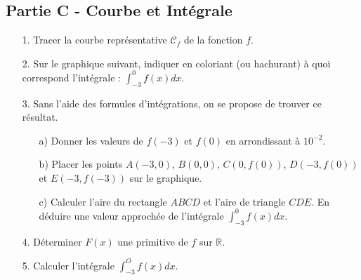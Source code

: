 \documentclass[12pt]{article}
\begin{document}
\subsection*{Partie C - Courbe et Intégrale}

\begin{enumerate}
\item[1.] Tracer la courbe représentative $\mathcal{C}_f$ de la fonction $f$.
\item[2.] Sur le graphique suivant, indiquer en coloriant (ou hachurant) à quoi correspond l'intégrale :  $\int_{-3}^{0} f(x) dx$.
\item[3.] Sans l'aide des formules d'intégrations, on se propose de trouver ce résultat.
  \begin{enumerate}
  \item[a)] Donner les valeurs de $f(-3)$ et $f(0)$ en arrondissant à $10^{-2}$.
  \item[b)] Placer les points $A\left(-3, 0\right)$, $B\left(0, 0\right)$, $C\left(0, f(0)\right)$, $D\left(-3, f(0)\right)$ et $E\left(-3, f(-3)\right)$ sur le graphique.
  \item[c)] Calculer l'aire du rectangle $ABCD$ et l'aire de triangle $CDE$. En déduire une valeur approchée de l'intégrale $\int_{-3}^{0} f(x) dx$.
  \end{enumerate}   
\item[4.] Déterminer $F(x)$ une primitive de $f$ sur $\mathbb{R}$.
\item[5.] Calculer l'intégrale $\int_{-3}^{O} f(x) dx$.
\end{enumerate}

\begin{figure}[H]
  \centering
\end{figure}
\end{document}

